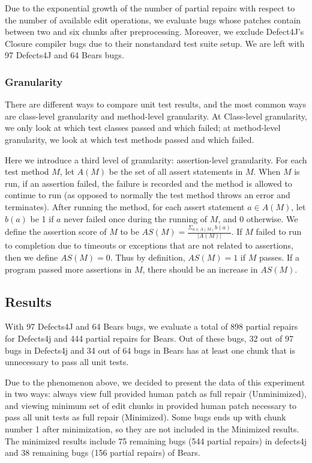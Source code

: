 \documentclass[sigconf, timestamp-false, anonymous=true]{acmart}
\begin{document}
Due to the exponential growth of the number of partial repairs with respect 
to the number of available edit operations, we evaluate bugs whose patches 
contain between two and six chunks after preprocessing.
Moreover, we exclude Defect4J's Closure compiler bugs due to 
their nonstandard test suite setup.
We are left with 97 Defects4J and 64 Bears bugs.

\subsubsection{Granularity}

There are different ways to compare unit test results, and the most common ways 
are class-level granularity and method-level granularity. At Class-level granularity, 
we only look at which test classes passed and which failed; at method-level 
granularity, we look at which test methods passed and which failed.

Here we introduce a third level of granularity: assertion-level granularity. 
For each test method $M$, let $A(M)$ be the set of all assert statements in $M$. 
When $M$ is run, if an assertion failed, the failure is recorded and the method 
is allowed to continue to run (as opposed to normally the test method throws an 
error and terminates). After running the method, for each assert statement 
$a\in A(M)$, let $b(a)$ be 1 if $a$ never failed once during the running of $M$, 
and 0 otherwise. We define the assertion score of $M$ to be 
$AS(M)=\frac{\Sigma_{a\in A(M)}b(a)}{|A(M)|}$. If $M$ failed to run to completion 
due to timeouts or exceptions that are not related to assertions, then we define 
$AS(M)=0$. Thus by definition, $AS(M)=1$ if $M$ passes. If a program passed more 
assertions in $M$, there should be an increase in $AS(M)$.


\subsection{Results}

With 97 Defects4J and 64 Bears bugs, we evaluate
a total of 898 partial repairs for Defects4j and 444 partial repairs for Bears.
Out of these bugs, 32 out of 97 bugs in Defects4j and 
34 out of 64 bugs in Bears has at least one chunk that
is unnecessary to pass all unit tests.

Due to the phenomenon above, we decided to present the
data of this experiment in two ways: always view full provided human patch as full repair
(Unminimized), and viewing minimum set of edit chunks in provided human patch necessary
to pass all unit tests as full repair (Minimized).
Some bugs ends up with chunk number 1 after minimization, 
so they are not included in the Minimized results. The minimized results 
include 75 remaining bugs (544 partial repairs) in defects4j and 38 remaining bugs (156 partial repairs) of Bears. 
\end{document}
